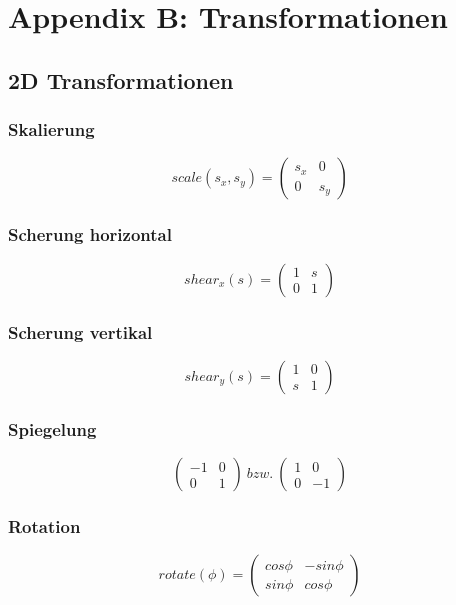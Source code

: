 \section{Appendix B: Transformationen}

\subsection{2D Transformationen}

\subsubsection{Skalierung}
\[scale(s_x,s_y) = \begin{pmatrix} s_x & 0 \\ 0 & s_y \end{pmatrix}\]

\subsubsection{Scherung horizontal}
\[shear_x(s) = \begin{pmatrix} 1 & s \\ 0 & 1 \end{pmatrix}\]

\subsubsection{Scherung vertikal}
\[shear_y(s) = \begin{pmatrix} 1 & 0 \\ s & 1 \end{pmatrix}\]

\subsubsection{Spiegelung}
\[\begin{pmatrix} -1 & 0 \\ 0 & 1 \end{pmatrix}~bzw.~\begin{pmatrix} 1 & 0 \\ 0 & -1 \end{pmatrix}\]

\subsubsection{Rotation}
\[rotate(\phi) = \begin{pmatrix} cos\phi & -sin\phi \\ sin\phi & cos\phi \end{pmatrix}\]


